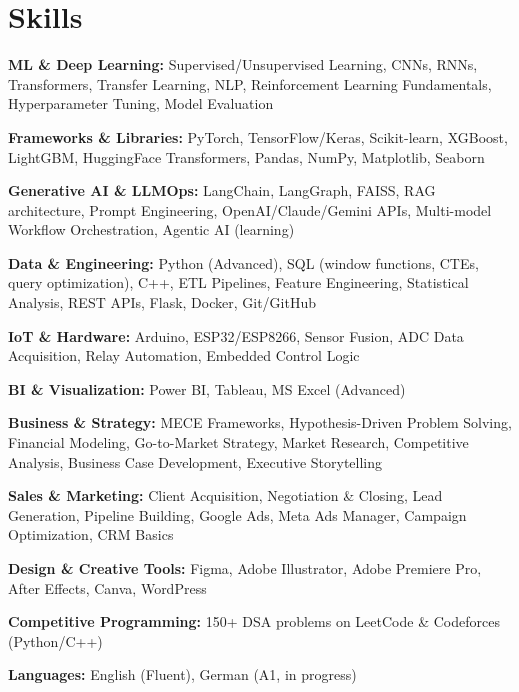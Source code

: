\documentclass[letterpaper,10.5pt]{article}
\begin{document}
\section{Skills}
\begin{itemize}[leftmargin=0.12in, label={}, itemsep=1pt, parsep=0pt]
  \small{
    \item \textbf{ML \& Deep Learning:} Supervised/Unsupervised Learning, CNNs, RNNs, Transformers, Transfer Learning, NLP, Reinforcement Learning Fundamentals, Hyperparameter Tuning, Model Evaluation
    \item \textbf{Frameworks \& Libraries:} PyTorch, TensorFlow/Keras, Scikit-learn, XGBoost, LightGBM, HuggingFace Transformers, Pandas, NumPy, Matplotlib, Seaborn
    \item \textbf{Generative AI \& LLMOps:} LangChain, LangGraph, FAISS, RAG architecture, Prompt Engineering, OpenAI/Claude/Gemini APIs, Multi-model Workflow Orchestration, Agentic AI (learning)
    \item \textbf{Data \& Engineering:} Python (Advanced), SQL (window functions, CTEs, query optimization), C++, ETL Pipelines, Feature Engineering, Statistical Analysis, REST APIs, Flask, Docker, Git/GitHub
    \item \textbf{IoT \& Hardware:} Arduino, ESP32/ESP8266, Sensor Fusion, ADC Data Acquisition, Relay Automation, Embedded Control Logic
    \item \textbf{BI \& Visualization:} Power BI, Tableau, MS Excel (Advanced)
    \item \textbf{Business \& Strategy:} MECE Frameworks, Hypothesis-Driven Problem Solving, Financial Modeling, Go-to-Market Strategy, Market Research, Competitive Analysis, Business Case Development, Executive Storytelling
    \item \textbf{Sales \& Marketing:} Client Acquisition, Negotiation \& Closing, Lead Generation, Pipeline Building, Google Ads, Meta Ads Manager, Campaign Optimization, CRM Basics
    \item \textbf{Design \& Creative Tools:} Figma, Adobe Illustrator, Adobe Premiere Pro, After Effects, Canva, WordPress
    \item \textbf{Competitive Programming:} 150+ DSA problems on LeetCode \& Codeforces (Python/C++)
    \item \textbf{Languages:} English (Fluent), German (A1, in progress)
  }
\end{itemize}
\vspace{-6pt}
\end{document}
